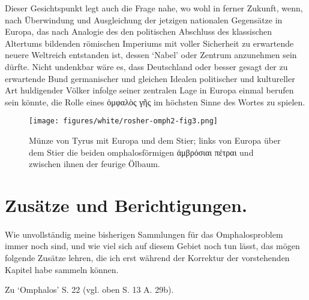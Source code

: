 \documentclass[a4paper, 11pt, oneside]{article}
\begin{document}
Dieser Gesichtspunkt legt auch die Frage nahe, wo wohl in ferner Zukunft, wenn, nach Überwindung und Ausgleichung der jetzigen nationalen Gegensätze in Europa, das nach Analogie des den politischen Abschluss des klassischen Altertums bildenden römischen Imperiums mit voller Sicherheit zu erwartende neuere Weltreich entstanden ist, dessen `Nabel' oder Zentrum anzunehmen sein dürfte. Nicht undenkbar wäre es, dass Deutschland oder besser gesagt der zu erwartende Bund germanischer und gleichen Idealen politischer und kultureller Art huldigender Völker infolge seiner zentralen Lage in Europa einmal berufen sein könnte, die Rolle eines ὀμφαλὸς γῆς im höchsten Sinne des Wortes zu spielen.
\begin{figure}[H]
\centering
\texttt{[image: figures/white/rosher-omph2-fig3.png]}
\caption{Münze von Tyrus mit Europa und dem Stier; links von Europa über dem Stier die beiden omphalosförmigen ἀμβρόσιαι πέτραι und zwischen ihnen der feurige Ölbaum.}
\end{figure}
\clearpage
\section{Zusätze und Berichtigungen.}
\paragraph{}
Wie unvollständig meine bisherigen Sammlungen für das Omphalosproblem immer noch sind, und wie viel sich auf diesem Gebiet noch tun lässt, das mögen folgende Zusätze lehren, die ich erst während der Korrektur der vorstehenden Kapitel habe sammeln können.

Zu `Omphalos' S. 22 (vgl. oben S. 13 A. 29b).
\end{document}
